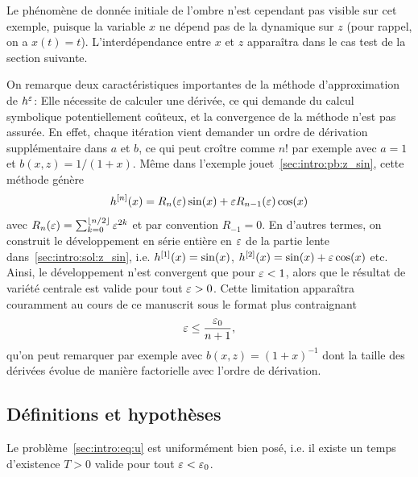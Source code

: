 \begin{FRremark*}
    Le phénomène de donnée initiale de l'ombre n'est cependant pas visible sur cet exemple, puisque la variable $x$ ne dépend pas de la dynamique sur $z$ (pour rappel, on a $x(t) = t$). L'interdépendance entre $x$ et $z$ apparaîtra dans le cas test de la section suivante.
\end{FRremark*}

On remarque deux caractéristiques importantes de la méthode d'approximation de $h^{\varepsilon}$: Elle nécessite de calculer une dérivée, ce qui demande du calcul symbolique potentiellement coûteux, et la convergence de la méthode n'est pas assurée. En effet, chaque itération vient demander un ordre de dérivation supplémentaire dans $a$ et $b$, ce qui peut croître comme $n!$ par exemple avec $a = 1$ et $b(x,z) = 1/(1+x)$. Même dans l'exemple jouet~\eqref{sec:intro:pb:z_sin}, cette méthode génère
\begin{equation*}
    h^{[n]}(x) = R_n(\varepsilon) \sin(x) + \varepsilon R_{n-1}(\varepsilon) \cos(x) 
\end{equation*}
avec $R_n(\varepsilon) = \sum_{k = 0}^{\left\lfloor n/2 \right\rfloor} \varepsilon^{2k}$ et par convention $R_{-1} = 0$. En d'autres termes, on construit le développement en série entière en $\varepsilon$ de la partie lente dans~\eqref{sec:intro:sol:z_sin}, i.e. $h^{[1]}(x) = \sin(x)$, $h^{[2]} (x) = \sin(x) + \varepsilon \cos(x)$ etc. Ainsi, le développement n'est convergent que pour $\varepsilon < 1$, alors que le résultat de variété centrale est valide pour tout $\varepsilon > 0$. 
%
Cette limitation apparaîtra couramment au cours de ce manuscrit sous le format plus contraignant
\begin{equation*}
    \varepsilon \leq \frac{\varepsilon_0}{n+1} ,
\end{equation*}
qu'on peut remarquer par exemple avec $b(x,z) = (1+x)^{-1}$ dont la taille des dérivées évolue de manière factorielle avec l'ordre de dérivation. 




\subsection*{Définitions et hypothèses}


\begin{FRproperty*}
    Le problème~\eqref{sec:intro:eq:u} est uniformément bien posé, i.e. il existe un temps d'existence $T > 0$ valide pour tout $\varepsilon < \varepsilon_0$. 
\end{FRproperty*}


